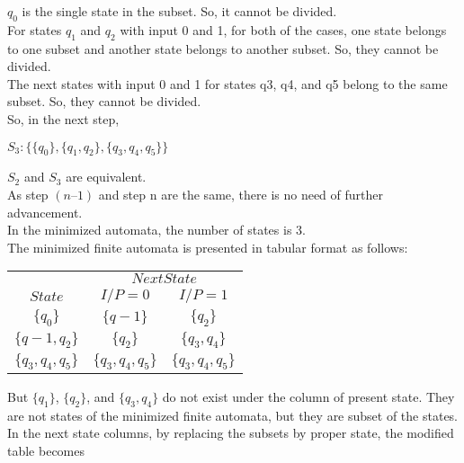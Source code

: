 \documentclass{article}
\begin{document}
$q_0$ is the single state in the subset. So, it cannot be divided.\\
\hspace*{0.1cm} For states $q_1$ and $q_2$ with input 0 and 1, for both of the cases, one state belongs to one subset and
another state belongs to another subset. So, they cannot be divided.\\
\hspace*{0.1cm} The next states with input 0 and 1 for states q3, q4, and q5 belong to the same subset. So, they cannot
be divided.\\
\hspace*{0.1cm} So, in the next step,

\vspace*{1cm}
\begin{center}
$S_3: \{\{q_0\}, \{q_1, q_2\}, \{q_3, q_4, q_5\}\}$
\end{center}

$S_2$ and $S_3$ are equivalent.\\
As step $(n–1)$ and step n are the same, there is no need of further advancement.\\
In the minimized automata, the number of states is $3$.\\
The minimized finite automata is presented in tabular format as follows:

\begin{center}
\begin{tabular}{ccc}
 \hline

 \hline

 \hline

 \hline
 & \multicolumn{2}{c}{$Next State$}\\
 \cline{2-3}
 $State$ &  $I/P=0$ & $I/P=1$\\
\hline
 $\{q_0\}$           &   $\{q-1\}$           &  $\{q_2\}$          \\
 $\{q-1,q_2\}$       &   $\{q_2\}$           &  $\{q_3,q_4\}$      \\
 $\{q_3,q_4,q_5\}$   &   $\{q_3,q_4,q_5\}$   &  $\{q_3,q_4,q_5\}$  \\
 \hline

 \hline

 \hline

 \hline
\end{tabular}
\end{center}

But $\{q_1\}$, $\{q_2\}$, and $\{q_3, q_4\}$ do not exist under the column of present state. They are not states of the
minimized finite automata, but they are subset of the states. In the next state columns, by replacing the
subsets by proper state, the modified table becomes
\end{document}

